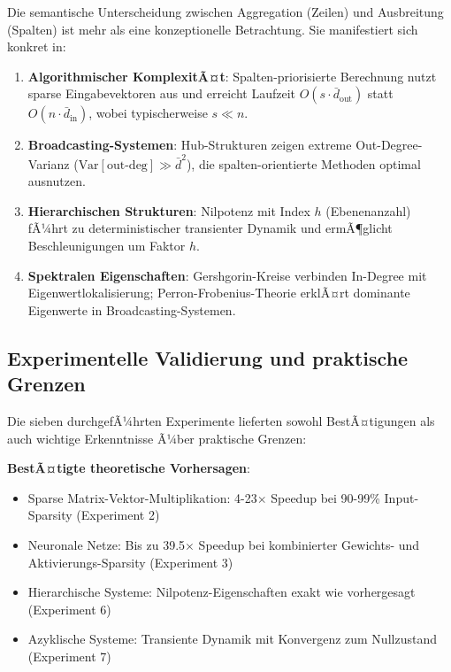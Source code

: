 ﻿\documentclass[a4paper,12pt]{report}
\theoremstyle{definition}
\begin{document}
	Die semantische Unterscheidung zwischen Aggregation (Zeilen) und Ausbreitung (Spalten) ist mehr als eine konzeptionelle Betrachtung. Sie manifestiert sich konkret in:
	
	\begin{enumerate}
		\item \textbf{Algorithmischer KomplexitÃ¤t}: Spalten-priorisierte Berechnung nutzt sparse Eingabevektoren aus und erreicht Laufzeit $O(s \cdot \bar{d}_{\text{out}})$ statt $O(n \cdot \bar{d}_{\text{in}})$, wobei typischerweise $s \ll n$.
		
		\item \textbf{Broadcasting-Systemen}: Hub-Strukturen zeigen extreme Out-Degree-Varianz ($\text{Var}[\text{out-deg}] \gg \bar{d}^2$), die spalten-orientierte Methoden optimal ausnutzen.
		
		\item \textbf{Hierarchischen Strukturen}: Nilpotenz mit Index $h$ (Ebenenanzahl) fÃ¼hrt zu deterministischer transienter Dynamik und ermÃ¶glicht Beschleunigungen um Faktor $h$.
		
		\item \textbf{Spektralen Eigenschaften}: Gershgorin-Kreise verbinden In-Degree mit Eigenwertlokalisierung; Perron-Frobenius-Theorie erklÃ¤rt dominante Eigenwerte in Broadcasting-Systemen.
	\end{enumerate}
	
	\subsection{Experimentelle Validierung und praktische Grenzen}
	
	Die sieben durchgefÃ¼hrten Experimente lieferten sowohl BestÃ¤tigungen als auch wichtige Erkenntnisse Ã¼ber praktische Grenzen:
	
	\textbf{BestÃ¤tigte theoretische Vorhersagen}:
	\begin{itemize}
		\item Sparse Matrix-Vektor-Multiplikation: 4-23$\times$ Speedup bei 90-99\% Input-Sparsity (Experiment 2)
		\item Neuronale Netze: Bis zu 39.5$\times$ Speedup bei kombinierter Gewichts- und Aktivierungs-Sparsity (Experiment 3)
		\item Hierarchische Systeme: Nilpotenz-Eigenschaften exakt wie vorhergesagt (Experiment 6)
		\item Azyklische Systeme: Transiente Dynamik mit Konvergenz zum Nullzustand (Experiment 7)
	\end{itemize}
	
\end{document}
